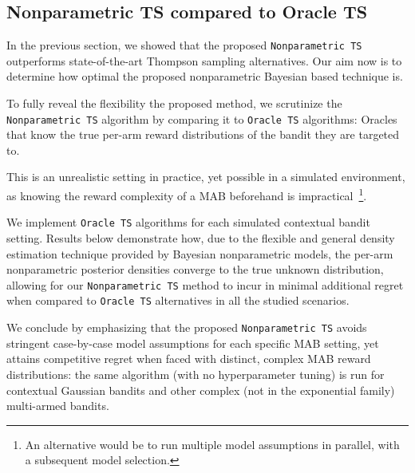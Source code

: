 \subsection{Nonparametric TS compared to Oracle TS}
\label{ssec:evaluation_oracle}

In the previous section, we showed that the proposed \texttt{Nonparametric TS} outperforms state-of-the-art Thompson sampling alternatives.
Our aim now is to determine how optimal the proposed nonparametric Bayesian based technique is.

To fully reveal the flexibility the proposed method, we scrutinize the \texttt{Nonparametric TS} algorithm by comparing it to \texttt{Oracle TS} algorithms: \ie Oracles that know the true per-arm reward distributions of the bandit they are targeted to.

This is an unrealistic setting in practice, yet possible in a simulated environment, as knowing the reward complexity of a MAB beforehand is impractical~\footnote{An alternative would be to run multiple model assumptions in parallel, with a subsequent model selection.}.

We implement \texttt{Oracle TS} algorithms for each simulated contextual bandit setting. Results below demonstrate how, due to the flexible and general density estimation technique provided by Bayesian nonparametric models, the per-arm nonparametric posterior densities converge to the true unknown distribution, allowing for our \texttt{Nonparametric TS} method to incur in minimal additional regret when compared to \texttt{Oracle TS} alternatives in all the studied scenarios.





We conclude by emphasizing that the proposed \texttt{Nonparametric TS} avoids stringent case-by-case model assumptions for each specific MAB setting, yet attains competitive regret when faced with distinct, complex MAB reward distributions: the same algorithm (with no hyperparameter tuning) is run for contextual Gaussian bandits and other complex (not in the exponential family) multi-armed bandits.